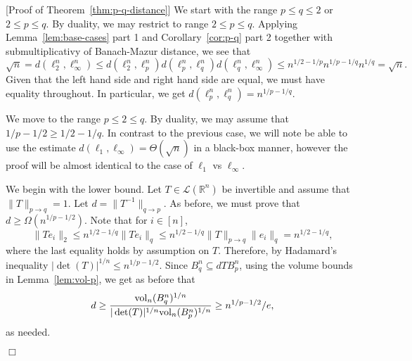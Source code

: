 \documentclass[11pt]{article}
\theoremstyle{plain}
\newenvironment{proof}{\noindent {\sc Proof:}}{$\Box$ \medskip}
\theoremstyle{plain}
\newcommand{\R}{\ensuremath{\mathbb{R}}}
\newcommand{\vol}{{\rm vol}}
\begin{document}
\begin{proof}[Proof of Theorem~\ref{thm:p-q-distance}]
We start with the range $p \leq q \leq 2$ or $2 \leq p \leq q$. By duality, we
may restrict to range $2 \leq p \leq q$. Applying Lemma~\ref{lem:base-cases} part 1
and Corollary~\ref{cor:p-q} part 2 together with submultiplicativy of
Banach-Mazur distance, we see that
\[
\sqrt{n} = d(\ell^n_2,\ell^n_\infty) \leq d(\ell^n_2,\ell^n_p)
d(\ell^n_p,\ell^n_q) d(\ell^n_q,\ell^n_\infty) \leq n^{1/2-1/p} n^{1/p-1/q}
n^{1/q} = \sqrt{n}.
\]
Given that the left hand side and right hand side are equal, we must have
equality throughout. In particular, we get $d(\ell^n_p,\ell^n_q) =
n^{1/p-1/q}$. 

We move to the range $p \leq 2 \leq q$. By duality, we may assume that $1/p-1/2
\geq 1/2-1/q$. In contrast to the previous case, we will note be able to use the
estimate $d(\ell_1,\ell_\infty) = \Theta(\sqrt{n})$ in a black-box manner,
however the proof will be almost identical to the case of $\ell_1$ vs
$\ell_\infty$.

We begin with the lower bound. Let $T \in \mathcal{L}(\R^n)$ be invertible and
assume that $\|T\|_{p \rightarrow q} = 1$. Let $d = \|T^{-1}\|_{q \rightarrow
p}$. As before, we must prove that $d \geq \Omega(n^{1/p-1/2})$. Note that for
$i \in [n]$,
\[
\|Te_i\|_2 \leq n^{1/2-1/q}\|Te_i\|_q 
           \leq n^{1/2-1/q}\|T\|_{p \rightarrow q} \|e_i\|_q 
           = n^{1/2-1/q},
\]
where the last equality holds by assumption on $T$. Therefore, by Hadamard's
inequality $|\det(T)|^{1/n} \leq n^{1/p-1/2}$. Since $B_q^n \subseteq d TB_p^n$,
using the volume bounds in Lemma~\ref{lem:vol-p}, we get as before that
\[
d \geq \frac{\vol_n(B_q^n)^{1/n}}{|\det(T)|^{1/n} \vol_n(B_p^n)^{1/n}}  
  \geq n^{1/p-1/2}/e,
\]
as needed.


\end{proof}
\end{document}
